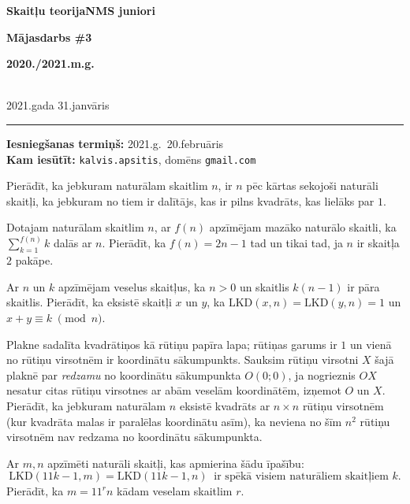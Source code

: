 \documentclass[a4paper,12pt]{article}
\begin{document}
\begin{center}
\parbox{3.5cm}{\flushleft\bf Skaitļu teorija\linebreak NMS juniori} \hfill {\bf\LARGE Mājasdarbs \#3} \hfill \parbox{3.5cm}{\flushright\bf 2020./2021.m.g.} \\[2pt]
\rm\small 2021.gada 31.janvāris
\end{center}

\hrule

\vspace{10pt}
{\bf Iesniegšanas termiņš:} 2021.g.\ 20.februāris\\
{\bf Kam iesūtīt:} {\tt kalvis.apsitis}, domēns {\tt gmail.com}

\vspace{10pt}
\begin{problem}
Pierādīt, ka jebkuram naturālam skaitlim $n$, ir $n$ pēc kārtas sekojoši 
naturāli skaitļi, ka jebkuram no tiem ir dalītājs, kas ir pilns kvadrāts, kas lielāks par $1$. 
\end{problem}

\vspace{10pt}
\begin{problem}
Dotajam naturālam skaitlim $n$, ar $f(n)$ apzīmējam mazāko naturālo skaitli, ka 
${\displaystyle \sum\limits_{k=1}^{f(n)} k}$ dalās ar $n$. 
Pierādīt, ka $f(n) = 2n-1$ tad un tikai tad, ja $n$ ir skaitļa $2$ pakāpe.
\end{problem}

\vspace{10pt}
\begin{problem}
Ar $n$ un $k$ apzīmējam veselus skaitļus, ka $n>0$ un skaitlis $k(n-1)$ ir pāra skaitlis. 
Pierādīt, ka eksistē skaitļi $x$ un $y$, ka $\text{LKD}(x,n) = \text{LKD}(y,n) = 1$ un 
$x + y \equiv k\;\pmod{n}$. 
\end{problem}

\vspace{10pt}
\begin{problem}
Plakne sadalīta kvadrātiņos kā rūtiņu papīra lapa; rūtiņas garums ir $1$ un vienā no rūtiņu 
virsotnēm ir koordinātu sākumpunkts.
Sauksim rūtiņu virsotni $X$ šajā plaknē par {\em redzamu} no koordinātu sākumpunkta 
$O(0;0)$, ja nogrieznis $OX$ nesatur citas rūtiņu virsotnes ar abām veselām koordinātēm, 
izņemot $O$ un $X$. Pierādīt, ka jebkuram naturālam $n$ eksistē kvadrāts ar $n \times n$ rūtiņu virsotnēm
(kur kvadrāta malas ir paralēlas koordinātu asīm), 
ka neviena no šīm $n^2$ rūtiņu virsotnēm nav redzama no koordinātu sākumpunkta.
\end{problem}

\vspace{10pt}
\begin{problem}
Ar $m, n$ apzīmēti naturāli skaitļi, kas apmierina šādu īpašību:
$$ \text{LKD}(11k-1,m) = \text{LKD}(11k-1,n)\;\;\text{ir spēkā visiem naturāliem skaitļiem $k$.}$$
Pierādīt, ka $m = 11^rn$ kādam veselam skaitlim $r$. 
\end{problem}
\end{document}
